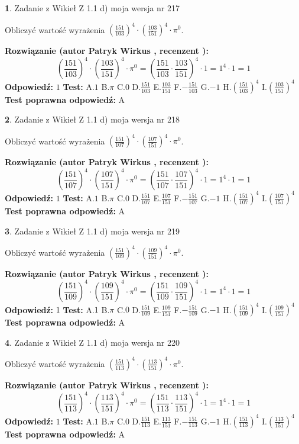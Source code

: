 \documentclass[12pt, a4paper]{article}
\theoremstyle{definition} %
\newtheorem{zad}{}
\newcommand{\zadStart}[1]{\begin{zad}#1\newline}
\newcommand{\zadStop}{\end{zad}}
\newcommand{\rozwStart}[2]{\noindent \textbf{Rozwiązanie (autor #1 , recenzent #2): }\newline}
\newcommand{\rozwStop}{\newline}
\newcommand{\odpStart}{\noindent \textbf{Odpowiedź:}\newline}
\newcommand{\odpStop}{\newline}
\newcommand{\testStart}{\noindent \textbf{Test:}\newline}
\newcommand{\testStop}{\newline}
\newcommand{\kluczStart}{\noindent \textbf{Test poprawna odpowiedź:}\newline}
\newcommand{\kluczStop}{\newline}
\begin{document}
\zadStart{Zadanie z Wikieł Z 1.1 d) moja wersja nr 217}

Obliczyć wartość wyrażenia $(\frac{151}{103})^{4} \cdot (\frac{103}{151})^{4} \cdot \pi^{0}$.
\zadStop
\rozwStart{Patryk Wirkus}{}
$$(\frac{151}{103})^{4} \cdot (\frac{103}{151})^{4} \cdot \pi^{0} = (\frac{151}{103} \cdot \frac{103}{151})^{4} \cdot 1 = 1^{4} \cdot 1 = 1$$
\rozwStop
\odpStart
$1$
\odpStop
\testStart
A.$1$ B.$\pi$ C.$0$ D.$\frac{151}{103}$ E.$\frac{103}{151}$
F.$-\frac{151}{103}$ G.$-1$
H.$(\frac{151}{103})^{4}$
I.$(\frac{103}{151})^{4}$
\testStop
\kluczStart
A
\kluczStop



\zadStart{Zadanie z Wikieł Z 1.1 d) moja wersja nr 218}

Obliczyć wartość wyrażenia $(\frac{151}{107})^{4} \cdot (\frac{107}{151})^{4} \cdot \pi^{0}$.
\zadStop
\rozwStart{Patryk Wirkus}{}
$$(\frac{151}{107})^{4} \cdot (\frac{107}{151})^{4} \cdot \pi^{0} = (\frac{151}{107} \cdot \frac{107}{151})^{4} \cdot 1 = 1^{4} \cdot 1 = 1$$
\rozwStop
\odpStart
$1$
\odpStop
\testStart
A.$1$ B.$\pi$ C.$0$ D.$\frac{151}{107}$ E.$\frac{107}{151}$
F.$-\frac{151}{107}$ G.$-1$
H.$(\frac{151}{107})^{4}$
I.$(\frac{107}{151})^{4}$
\testStop
\kluczStart
A
\kluczStop



\zadStart{Zadanie z Wikieł Z 1.1 d) moja wersja nr 219}

Obliczyć wartość wyrażenia $(\frac{151}{109})^{4} \cdot (\frac{109}{151})^{4} \cdot \pi^{0}$.
\zadStop
\rozwStart{Patryk Wirkus}{}
$$(\frac{151}{109})^{4} \cdot (\frac{109}{151})^{4} \cdot \pi^{0} = (\frac{151}{109} \cdot \frac{109}{151})^{4} \cdot 1 = 1^{4} \cdot 1 = 1$$
\rozwStop
\odpStart
$1$
\odpStop
\testStart
A.$1$ B.$\pi$ C.$0$ D.$\frac{151}{109}$ E.$\frac{109}{151}$
F.$-\frac{151}{109}$ G.$-1$
H.$(\frac{151}{109})^{4}$
I.$(\frac{109}{151})^{4}$
\testStop
\kluczStart
A
\kluczStop



\zadStart{Zadanie z Wikieł Z 1.1 d) moja wersja nr 220}

Obliczyć wartość wyrażenia $(\frac{151}{113})^{4} \cdot (\frac{113}{151})^{4} \cdot \pi^{0}$.
\zadStop
\rozwStart{Patryk Wirkus}{}
$$(\frac{151}{113})^{4} \cdot (\frac{113}{151})^{4} \cdot \pi^{0} = (\frac{151}{113} \cdot \frac{113}{151})^{4} \cdot 1 = 1^{4} \cdot 1 = 1$$
\rozwStop
\odpStart
$1$
\odpStop
\testStart
A.$1$ B.$\pi$ C.$0$ D.$\frac{151}{113}$ E.$\frac{113}{151}$
F.$-\frac{151}{113}$ G.$-1$
H.$(\frac{151}{113})^{4}$
I.$(\frac{113}{151})^{4}$
\testStop
\kluczStart
A
\kluczStop
\end{document}
